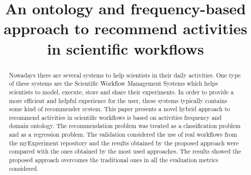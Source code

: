 \documentclass{sig-alternate-05-2015}
\begin{document}






%

\title{An ontology and frequency-based approach to recommend activities in scientific workflows}


\author{
}

\maketitle
\begin{abstract}
Nowadays there are several systems to help scientists in their daily activities. One type of these systems are the Scientific Workflow Management Systems which helps scientists to model, execute, store and share their experiments. In order to provide a more efficient and helpful experience for the user, these systems typically contains some kind of recommender system.
This paper presents a novel hybrid approach to recommend activities in scientific workflows is based on activities frequency and domain ontology.
The recommendation problem was treated as a classification problem and as a regression problem. The validation considered the use of real workflows from the myExperiment repository and the results obtained by the proposed approach were compared with the ones obtained by the most used approaches.
The results showed the proposed approach overcomes the traditional ones in all the evaluation metrics considered.
\end{abstract}
\end{document}
